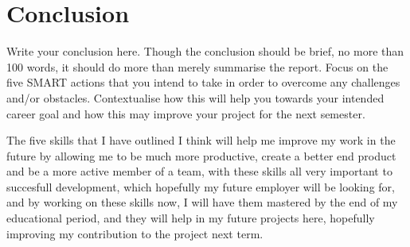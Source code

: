 \documentclass{scrartcl}
\begin{document}
\section{Conclusion}

Write your conclusion here. Though the conclusion should be brief, no more than 100 words, it should do more than merely summarise the report. Focus on the five SMART actions that you intend to take in order to overcome any challenges and/or obstacles. Contextualise how this will help you towards your intended career goal and how this may improve your project for the next semester.

The five skills that I have outlined I think will help me improve my work in the future by allowing me to be much more productive, create a better end product and be a more active member of a team, with these skills all very important to succesfull development, which hopefully my future employer will be looking for, and by working on these skills now, I will have them mastered by the end of my educational period, and they will help in my future projects here, hopefully improving my contribution to the project next term. 



\end{document}
